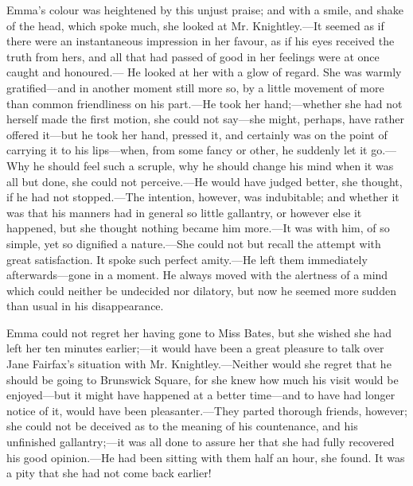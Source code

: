 
Emma's colour was heightened by this unjust praise; and with a smile, and shake of the head, which spoke much, she looked at Mr. Knightley.---It seemed as if there were an instantaneous impression in her favour, as if his eyes received the truth from hers, and all that had passed of good in her feelings were at once caught and honoured.--- He looked at her with a glow of regard. She was warmly gratified---and in another moment still more so, by a little movement of more than common friendliness on his part.---He took her hand;---whether she had not herself made the first motion, she could not say---she might, perhaps, have rather offered it---but he took her hand, pressed it, and certainly was on the point of carrying it to his lips---when, from some fancy or other, he suddenly let it go.---Why he should feel such a scruple, why he should change his mind when it was all but done, she could not perceive.---He would have judged better, she thought, if he had not stopped.---The intention, however, was indubitable; and whether it was that his manners had in general so little gallantry, or however else it happened, but she thought nothing became him more.---It was with him, of so simple, yet so dignified a nature.---She could not but recall the attempt with great satisfaction. It spoke such perfect amity.---He left them immediately afterwards---gone in a moment. He always moved with the alertness of a mind which could neither be undecided nor dilatory, but now he seemed more sudden than usual in his disappearance.

Emma could not regret her having gone to Miss Bates, but she wished she had left her ten minutes earlier;---it would have been a great pleasure to talk over Jane Fairfax's situation with Mr. Knightley.---Neither would she regret that he should be going to Brunswick Square, for she knew how much his visit would be enjoyed---but it might have happened at a better time---and to have had longer notice of it, would have been pleasanter.---They parted thorough friends, however; she could not be deceived as to the meaning of his countenance, and his unfinished gallantry;---it was all done to assure her that she had fully recovered his good opinion.---He had been sitting with them half an hour, she found. It was a pity that she had not come back earlier!

